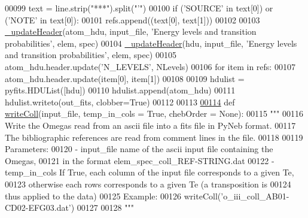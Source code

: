 \begin{DoxyCode}
00099             text = line.strip(\textcolor{stringliteral}{"***"}).split(\textcolor{stringliteral}{"'"})
00100             \textcolor{keywordflow}{if} (\textcolor{stringliteral}{'SOURCE'} \textcolor{keywordflow}{in} text[0]) \textcolor{keywordflow}{or} (\textcolor{stringliteral}{'NOTE'} \textcolor{keywordflow}{in} text[0]):
00101                 refs.append((text[0], text[1]))
00102 
00103     \hyperlink{namespacepyneb_1_1utils_1_1fits_a2c9c6cf69be4278cdfb529f3a8f3dced}{\_updateHeader}(atom\_hdu, input\_file, \textcolor{stringliteral}{'Energy levels and transition probabilities'}, elem, 
      spec)
00104     \hyperlink{namespacepyneb_1_1utils_1_1fits_a2c9c6cf69be4278cdfb529f3a8f3dced}{\_updateHeader}(hdu, input\_file, \textcolor{stringliteral}{'Energy levels and transition probabilities'}, elem, spec)
00105     atom\_hdu.header.update(\textcolor{stringliteral}{'N\_LEVELS'}, NLevels)
00106     \textcolor{keywordflow}{for} item \textcolor{keywordflow}{in} refs:
00107         atom\_hdu.header.update(item[0], item[1])
00108 
00109     hdulist = pyfits.HDUList([hdu])
00110     hdulist.append(atom\_hdu)
00111     hdulist.writeto(out\_fits, clobber=\textcolor{keyword}{True})
00112 
00113 
\hypertarget{fits_8py_source_l00114}{}\hyperlink{namespacepyneb_1_1utils_1_1fits_a468ecdfaa21de61a1037128ee889fd76}{00114} \textcolor{keyword}{def }\hyperlink{namespacepyneb_1_1utils_1_1fits_a468ecdfaa21de61a1037128ee889fd76}{writeColl}(input\_file, temp\_in\_cols = True, chebOrder = None):
00115     \textcolor{stringliteral}{""" }
00116 \textcolor{stringliteral}{    Write the Omegas read from an ascii file into a fits file in PyNeb format.}
00117 \textcolor{stringliteral}{    The bibliographic references are read from comment lines in the file.}
00118 \textcolor{stringliteral}{        }
00119 \textcolor{stringliteral}{    Parameters:}
00120 \textcolor{stringliteral}{        - input\_file    name of the ascii input file containing the Omegas,}
00121 \textcolor{stringliteral}{                        in the format elem\_spec\_coll\_REF-STRING.dat}
00122 \textcolor{stringliteral}{        - temp\_in\_cols  If True, each column of the input file corresponds to a given Te, }
00123 \textcolor{stringliteral}{                         otherwise each rows corresponds to a given Te (a transposition is }
00124 \textcolor{stringliteral}{                         thus applied to the data)}
00125 \textcolor{stringliteral}{    Example: }
00126 \textcolor{stringliteral}{    writeColl('o\_iii\_coll\_AB01-CD02-EFG03.dat')}
00127 \textcolor{stringliteral}{}
00128 \textcolor{stringliteral}{    """}

\end{DoxyCode}

